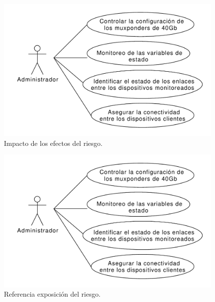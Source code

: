 \begin{figure}[H]
  \centering
  \includegraphics[scale=0.53]{Figures/caso_uso_admin.pdf}
  \caption{Impacto de los efectos del riesgo.}
  \label{fig:niveles_riesgo}
\end{figure}

\begin{figure}[H]
  \centering
  \includegraphics[scale=0.53]{Figures/caso_uso_admin.pdf}
  \caption{Referencia exposición del riesgo.}
  \label{fig:expo_riesgo}
\end{figure}